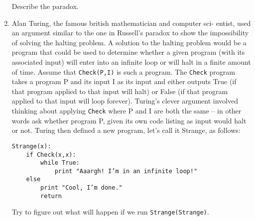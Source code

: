 \documentclass{amsart}
\begin{document}
\begin{enumerate}
Describe the paradox.

\vfill

\newpage

\item Alan Turing, the famous british mathematician and computer sci-
entist, used an argument similar to the one in Russell’s paradox to
show the impossibility of solving the halting problem. A solution
to the halting problem would be a program that could be used to
determine whether a given program (with its associated input) will
enter into an infinite loop or will halt in a finite amount of time.
Assume that {\tt Check(P,I)} is such a program. The {\tt Check} program
takes a program P and its input I as its input and either outputs
True (if that program applied to that input will halt) or False (if
that program applied to that input will loop forever). Turing’s
clever argument involved thinking about applying {\tt Check} where P
and I are both the same – in other words ask whether program P,
given its own code listing as input would halt or not.
Turing then defined a new program, let’s call it Strange, as
follows:
\medskip

\begin{verbatim}
Strange(x):
    if Check(x,x):
        while True:
            print "Aaargh! I’m in an infinite loop!"
    else
        print "Cool, I’m done."
        return
\end{verbatim}
\medskip


Try to figure out what will happen if we run {\tt Strange(Strange)}.


\end{enumerate}
\end{document}
